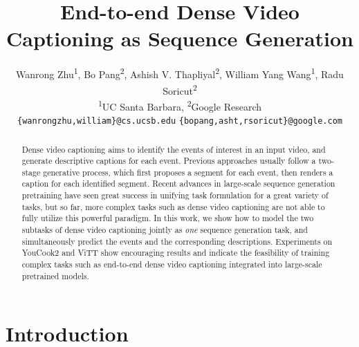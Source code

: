 \documentclass[11pt]{article}
\title{End-to-end Dense Video Captioning as Sequence Generation}
\author{
Wanrong Zhu\textsuperscript{1}, 
Bo Pang\textsuperscript{2},
Ashish V. Thapliyal\textsuperscript{2}, 
William Yang Wang\textsuperscript{1}, 
Radu Soricut\textsuperscript{2} \\
\textsuperscript{1}UC Santa Barbara, 
\textsuperscript{2}Google Research\\
\texttt{\small \{wanrongzhu,william\}@cs.ucsb.edu}
\texttt{\small \{bopang,asht,rsoricut\}@google.com}
}
\begin{document}
\maketitle

\newcommand{\TODO}[1]{\textcolor{red}{[TODO]: #1}}
\newcommand{\partitiontask}[0]{modified dense video captioning\xspace}
\newcommand{\partitionsetting}[0]{modified setting\xspace}
\newcommand{\Partitiontask}[0]{Modified dense video captioning\xspace}
\newcommand{\Vanilla}{Original\xspace}
\newcommand{\vanilla}{original\xspace}
\newcommand{\Hardencoding}[0]{Tagging-based\xspace}
\newcommand{\Offsetbased}[0]{Length-based\xspace}
\newcommand{\hardencoding}[0]{tagging-based\xspace}
\newcommand{\offsetbased}[0]{length-based\xspace}
\newcommand{\timestampbased}[0]{Timestamp markers\xspace}
\newcommand{\TemporalEmb}{Temporal embedding\xspace}
\newcommand{\temporalEmb}{temporal embedding\xspace}
\newcommand{\TemporalEmbShort}{Emb\textsubscript{\sc{Time}}\xspace}
\newcommand{\SimpleConcat}{Simple Concatenation\xspace}
\newcommand{\SimpleConcatShort}{SimpleConcat\xspace}
\newcommand{\notemporal}{\SimpleConcatShort}
\newcommand{\timeanchorShort}{T-marker\xspace}
\newcommand{\withtemporal}{+ \TemporalEmbShort}
\newcommand{\withanchor}{+ \timeanchorShort}
\newcommand{\segonly}{Seg-only model\xspace}
\newcommand{\segcap}{Seg+Cap model\xspace}
\newcommand{\sep}{$\langle$sep$\rangle$}
\newcommand{\pad}{$\langle$pad$\rangle$}



\begin{abstract}
Dense video captioning aims to identify the events of interest in an input video, and generate descriptive captions for each event.
Previous approaches usually follow a two-stage generative process, which first proposes a segment for each event, then renders a caption for each identified segment.
Recent advances in large-scale sequence generation pretraining have seen great success in unifying task formulation for a great variety of tasks, but so far, more complex tasks such as dense video captioning are not able to fully utilize this powerful paradigm.
In this work, we show how to model the two subtasks of dense video captioning jointly as {\em one} sequence generation task, and simultaneously predict the events and the corresponding descriptions.
Experiments on YouCook2 and ViTT show encouraging results and indicate the feasibility of training complex tasks such as end-to-end dense video captioning integrated into large-scale pretrained models.
\end{abstract} \section{Introduction}
\end{document}
